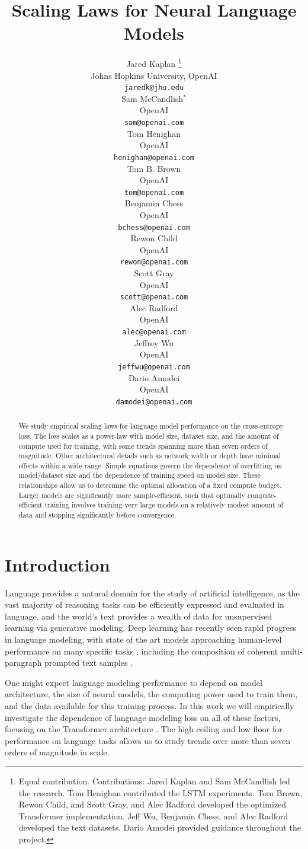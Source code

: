 \documentclass[english]{article}
\title{Scaling Laws for Neural Language Models}
\author{
    Jared Kaplan \thanks{Equal contribution. \newline \newline
    Contributions: Jared Kaplan and Sam McCandlish led the research.  Tom Henighan contributed the LSTM experiments.  Tom Brown, Rewon Child, and Scott Gray, and Alec Radford developed the optimized Transformer implementation.  Jeff Wu, Benjamin Chess, and Alec Radford developed the text datasets.  Dario Amodei provided guidance throughout the project. \newline \newline
    }\\
    Johns Hopkins University, OpenAI \\
    \texttt{jaredk@jhu.edu} \\
\And
    Sam McCandlish$^{\ast}$\\
    OpenAI \\
    \texttt{sam@openai.com} \\
\AND
    Tom Henighan \\
    OpenAI \\
    \texttt{henighan@openai.com} \\
\And
    Tom B. Brown \\
    OpenAI \\
    \texttt{tom@openai.com} \\
\And
    Benjamin Chess\\
    OpenAI \\
    \texttt{bchess@openai.com} \\
\And
    Rewon Child\\
    OpenAI \\
    \texttt{rewon@openai.com} \\
\And
    Scott Gray\\
    OpenAI \\
    \texttt{scott@openai.com} \\
\And
    Alec Radford\\
    OpenAI \\
    \texttt{alec@openai.com} \\
\And
    Jeffrey Wu\\
    OpenAI \\
    \texttt{jeffwu@openai.com} \\
\And
    Dario Amodei \\
    OpenAI \\
    \texttt{damodei@openai.com} \\
}
\begin{document}
\maketitle

\begin{abstract}
We study empirical scaling laws for language model performance on the cross-entropy loss.
The loss scales as a power-law with model size, dataset size, and the amount of compute used for training, with some trends spanning more than seven orders of magnitude.
Other architectural details such as network width or depth have minimal effects within a wide range.
Simple equations govern the dependence of overfitting on model/dataset size and the dependence of training speed on model size.
These relationships allow us to determine the optimal allocation of a fixed compute budget.
Larger models are significantly more sample-efficient, such that optimally compute-efficient training involves training very large models on a relatively modest amount of data and stopping significantly before convergence.

\end{abstract}

\newpage\tableofcontents{}

\section{Introduction}

Language provides a natural domain for the study of artificial intelligence, as the vast majority of reasoning tasks can be efficiently expressed and evaluated in language, and the world's text provides a wealth of data for unsupervised learning via generative modeling.  Deep learning has recently seen rapid progress in language modeling, with state of the art models \cite{radford2018improving,1810.04805,1906.08237,DBLP:journals/corr/abs-1907-11692, 1910.10683} approaching human-level performance on many specific tasks \cite{wang2019superglue}, including the composition of coherent multi-paragraph prompted text samples \cite{radford2019language}.

One might expect language modeling performance to depend on model architecture, the size of neural models, the computing power used to train them, and the data available for this training process.  In this work we will empirically investigate the dependence of language modeling loss on all of these factors, focusing on the Transformer architecture \cite{OriginalTransformer,liu2018generating}.  The high ceiling and low floor for performance on language tasks allows us to study trends over more than seven orders of magnitude in scale.
\end{document}
